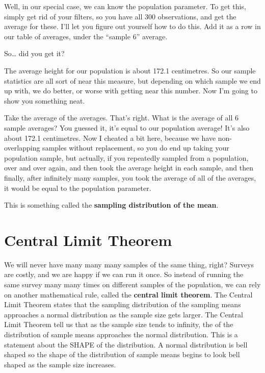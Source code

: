 \documentclass[]{book}
\theoremstyle{definition}
\theoremstyle{definition}
\theoremstyle{definition}
\theoremstyle{remark}
\begin{document}
Well, in our special case, we can know the population parameter. To get
this, simply get rid of your filters, so you have all 300 observations,
and get the average for these. I'll let you figure out yourself how to
do this. Add it as a row in our table of averages, under the ``sample
6'' average.

So\ldots{} did you get it?

The average height for our population is about 172.1 centimetres. So our
sample statistics are all sort of near this measure, but depending on
which sample we end up with, we do better, or worse with getting near
this number. Now I'm going to show you something neat.

Take the average of the averages. That's right. What is the average of
all 6 sample averages? You guessed it, it's equal to our population
average! It's also about 172.1 centimetres. Now I cheated a bit here,
because we have non-overlapping samples without replacement, so you do
end up taking your population sample, but actually, if you repeatedly
sampled from a population, over and over again, and then took the
average height in each sample, and then finally, after infinitely many
samples, you took the average of all of the averages, it would be equal
to the population parameter.

This is something called the \textbf{sampling distribution of the mean}.

\hypertarget{central-limit-theorem}{%
\section{Central Limit Theorem}\label{central-limit-theorem}}

We will never have many many many samples of the same thing, right?
Surveys are costly, and we are happy if we can run it once. So instead
of running the same survey many many times on different samples of the
population, we can rely on another mathematical rule, called the
\textbf{central limit theorem}. The Central Limit Theorem states that
the sampling distribution of the sampling means approaches a normal
distribution as the sample size gets larger. The Central Limit Theorem
tell us that as the sample size tends to infinity, the of the
distribution of sample means approaches the normal distribution. This is
a statement about the SHAPE of the distribution. A normal distribution
is bell shaped so the shape of the distribution of sample means begins
to look bell shaped as the sample size increases.
\end{document}
